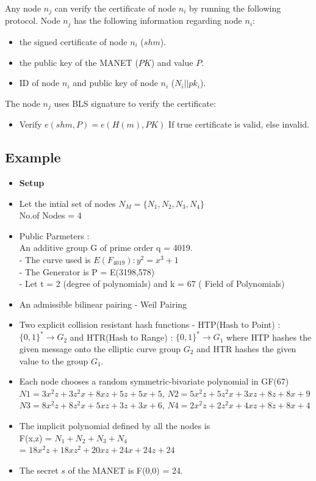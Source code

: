 \documentclass[11pt,a4paper]{llncs}
\begin{document}
Any node $n_j$ can verify the certificate of node $n_i$ by running the following protocol. Node $n_j$ has the following information regarding node $n_i$:
\begin{itemize}
\item the signed certificate of node $n_i$ ($shm$).
\item the public key of the MANET ($PK$) and value $P$.
\item ID of node $n_i$ and public key of node $n_i$ ($N_i$$||$$pk_i$).
\end{itemize}
The node $n_j$ uses BLS signature to verify the certificate:
\begin{itemize}    
   \item Verify $e(shm,P)=e(H(m),PK)$ If true certificate is valid, else invalid.    
\end{itemize}

\subsection{Example}
\begin{itemize}
	\item \textbf{Setup}
	\item Let the intial set of nodes $N_M = \{N_1,N_2,N_3,N_4\}$ \\ No.of Nodes = 4
	\item Public Parmeters : \\
        An additive group G of prime order q = 4019.\\
        - The curve used is     $E(F_{4019}) : y^2 = x^{3} +  1  $ \\
        - The Generator is P = E(3198,578)\\
 		- Let t = 2 (degree of polynomials) and k = 67 ( Field of Polynomials)
     \item An admissible bilinear pairing - Weil Pairing
     \item Two explicit collision resistant hash functions - HTP(Hash to Point) : 
     $\{0,1\}^*\rightarrow G_2$ and HTR(Hash to Range) : $\{0,1\}^*\rightarrow G_1$ where HTP 
     hashes the given message onto the elliptic curve group $G_2$ and HTR hashes the given value 
     to the group $G_1$.   
  
        \item Each node chooses a random symmetric-bivariate polynomial in GF(67)\\
        $N1 = 3x^2z+3z^2x+8xz+5z+5x+5$,
        $N2 = 5x^2z+5z^2x+3xz+8z+8x+9$\\
        $N3 = 8x^2z+8z^2x+5xz+3z+3x+6$,
        $N4 = 2x^2z+2z^2x+4xz+8z+8x+4$
        \item The implicit polynomial defined by all the nodes is \\
        F(x,z) = $ N_1 + N_2 + N_3 + N_4 $\\
               = $18x^2z + 18xz^2 + 20xz + 24x + 24z + 24$ 
    \item The secret $s$ of the MANET is F(0,0) = 24.
   \end{itemize}
       
\end{document}
